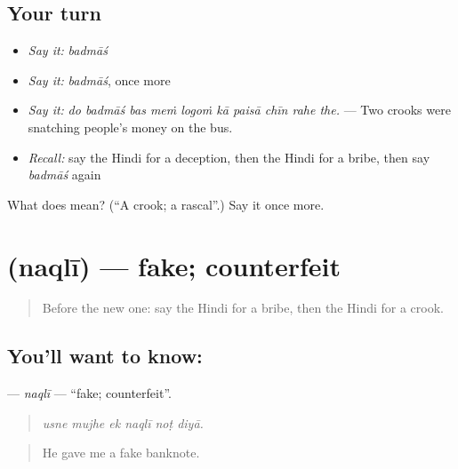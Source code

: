 \subsection*{Your turn}
\begin{itemize}
\raggedright
  \item \emph{Say it:} \emph{badmāś}
  \item \emph{Say it:} \emph{badmāś}, once more
  \item \emph{Say it:} \emph{do badmāś bas meṁ logoṁ kā paisā chīn rahe the.} — Two crooks were snatching people's money on the bus.
  \item \emph{Recall:} say the Hindi for a deception, then the Hindi for a bribe, then say \emph{badmāś} again
\end{itemize}

\begin{tcolorbox}[breakable,colback=teal!4,colframe=teal!35!black,title={Before you move on}]
What does  mean? (\textquotedblleft{}A crook; a rascal\textquotedblright{}.) Say it once more.
\end{tcolorbox}
\section[\texorpdfstring{\hi{नक़ली} (naqlī)}{नक़ली (naqlī)}]{ (naqlī) — fake; counterfeit}

\label{lesson:HI-C293-naqli}



\begin{quote}
Before the new one: say the Hindi for a bribe, then the Hindi for a crook.
\end{quote}

\subsection*{You'll want to know: }
\textbf{} — \emph{naqlī} — \textquotedblleft{}fake; counterfeit\textquotedblright{}.

\begin{quote}
     
\end{quote}

\begin{quote}
\emph{usne mujhe ek naqlī noṭ diyā.}
\end{quote}

\begin{quote}
He gave me a fake banknote.
\end{quote}

